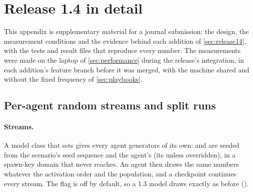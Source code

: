 \section{Release 1.4 in detail}
\label{app:release14}

This appendix is supplementary material for a journal submission: the design, the
measurement conditions and the evidence behind each addition of \cref{sec:release14}, with
the tests and result files that reproduce every number. The measurements were made on the
laptop of \cref{sec:performance} during the release's integration, in each addition's feature
branch before it was merged, with the machine shared and without the fixed frequency of
\cref{sec:playbooks}.

\subsection{Per-agent random streams and split runs}
\label{app:split}

\paragraph{Streams.} A model class that sets  gives every agent
generators of its own:  and  are seeded from the
scenario's seed sequence and the agent's  (its  unless
overridden), in a spawn-key domain that  never reaches. An agent
then draws the same numbers whatever the activation order and the population, and a
checkpoint continues every stream. The flag is off by default, so a 1.3 model draws exactly
as before ().

